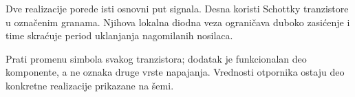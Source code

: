 Dve realizacije porede isti osnovni put signala. Desna koristi Schottky tranzistore u označenim granama. Njihova lokalna diodna veza ograničava duboko zasićenje i time skraćuje period uklanjanja nagomilanih nosilaca.

Prati promenu simbola svakog tranzistora; dodatak je funkcionalan deo komponente, a ne oznaka druge vrste napajanja. Vrednosti otpornika ostaju deo konkretne realizacije prikazane na šemi.
